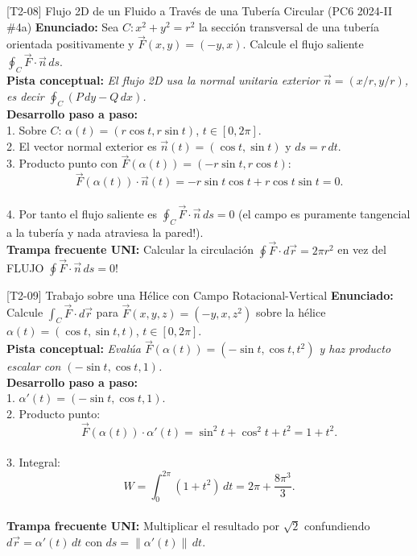 \documentclass[11pt,a4paper]{article}
\begin{document}
\begin{ejerciciobox}{[T2-08] Flujo 2D de un Fluido a Través de una Tubería Circular (PC6 2024-II \#4a)}
\textbf{Enunciado:} Sea $C: x^2 + y^2 = r^2$ la sección transversal de una tubería orientada positivamente y $\vec{F}(x,y) = (-y, x)$. Calcule el flujo saliente $\oint_C \vec{F}\cdot\vec{n}\,ds$.\\[0.2cm]
\textbf{Pista conceptual:} \emph{El flujo 2D usa la normal unitaria exterior $\vec{n} = (x/r, y/r)$, es decir $\oint_C (P\,dy - Q\,dx)$.}\\[0.2cm]
\textbf{Desarrollo paso a paso:}\\
1. Sobre $C$: $\alpha(t) = (r\cos t, r\sin t)$, $t \in [0, 2\pi]$.\\
2. El vector normal exterior es $\vec{n}(t) = (\cos t, \sin t)$ y $ds = r\,dt$.\\
3. Producto punto con $\vec{F}(\alpha(t)) = (-r\sin t, r\cos t)$:\\
$$\vec{F}(\alpha(t))\cdot\vec{n}(t) = -r\sin t\cos t + r\cos t\sin t = 0.$$\\
4. Por tanto el flujo saliente es $\oint_C \vec{F}\cdot\vec{n}\,ds = 0$ (el campo es puramente tangencial a la tubería y nada atraviesa la pared!).\\[0.2cm]
\textbf{Trampa frecuente UNI:} Calcular la circulación $\oint \vec{F}\cdot d\vec{r} = 2\pi r^2$ en vez del FLUJO $\oint \vec{F}\cdot\vec{n}\,ds = 0$!
\end{ejerciciobox}

\begin{ejerciciobox}{[T2-09] Trabajo sobre una Hélice con Campo Rotacional-Vertical}
\textbf{Enunciado:} Calcule $\int_C \vec{F}\cdot d\vec{r}$ para $\vec{F}(x,y,z) = (-y, x, z^2)$ sobre la hélice $\alpha(t) = (\cos t, \sin t, t)$, $t \in [0, 2\pi]$.\\[0.2cm]
\textbf{Pista conceptual:} \emph{Evalúa $\vec{F}(\alpha(t)) = (-\sin t, \cos t, t^2)$ y haz producto escalar con $(-\sin t, \cos t, 1)$.}\\[0.2cm]
\textbf{Desarrollo paso a paso:}\\
1. $\alpha'(t) = (-\sin t, \cos t, 1)$.\\
2. Producto punto:\\
$$\vec{F}(\alpha(t))\cdot\alpha'(t) = \sin^2 t + \cos^2 t + t^2 = 1 + t^2.$$\\
3. Integral:\\
$$W = \int_0^{2\pi} (1 + t^2)\,dt = 2\pi + \frac{8\pi^3}{3}.$$\\[0.2cm]
\textbf{Trampa frecuente UNI:} Multiplicar el resultado por $\sqrt{2}$ confundiendo $d\vec{r} = \alpha'(t)\,dt$ con $ds = \|\alpha'(t)\|\,dt$.
\end{ejerciciobox}
\end{document}
